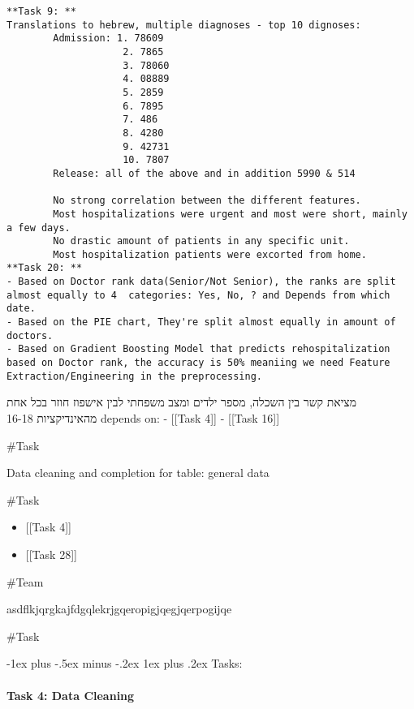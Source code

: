\documentclass[a4paper,landscape]{article}
\makeatletter
\renewcommand{\subsubsection}{\@startsection{subsubsection}{3}{0mm}%
                                {-1ex plus -.5ex minus -.2ex}%
                                {1ex plus .2ex}%
                                {\normalfont\small\bfseries}}
\providecommand{\tightlist}{%
  \setlength{\itemsep}{0pt}\setlength{\parskip}{0pt}}
\makeatother
\begin{document}
\begin{verbatim}
**Task 9: **
Translations to hebrew, multiple diagnoses - top 10 dignoses:
        Admission: 1. 78609
                    2. 7865
                    3. 78060
                    4. 08889
                    5. 2859
                    6. 7895
                    7. 486
                    8. 4280
                    9. 42731
                    10. 7807
        Release: all of the above and in addition 5990 & 514

        No strong correlation between the different features.
        Most hospitalizations were urgent and most were short, mainly a few days.
        No drastic amount of patients in any specific unit.
        Most hospitalization patients were excorted from home.
**Task 20: **
- Based on Doctor rank data(Senior/Not Senior), the ranks are split almost equally to 4  categories: Yes, No, ? and Depends from which date.
- Based on the PIE chart, They're split almost equally in amount of doctors.
- Based on Gradient Boosting Model that predicts rehospitalization based on Doctor rank, the accuracy is 50% meaniing we need Feature Extraction/Engineering in the preprocessing.
\end{verbatim}

מציאת קשר בין השכלה, מספר ילדים ומצב משפחתי לבין אישפוז חוזר בכל אחת
מהאינדיקציות 16-18 depends on: - {[}{[}Task 4{]}{]} - {[}{[}Task
16{]}{]}

\#Task

Data cleaning and completion for table: general data

\#Task

\begin{itemize}
\tightlist
\item
  {[}{[}Task 4{]}{]}
\item
  {[}{[}Task 28{]}{]}
\end{itemize}

\#Team

asdflkjqrgkajfdgqlekrjgqeropigjqegjqerpogijqe

\#Task

\subsubsection{Tasks:}\label{tasks-1}

\paragraph{Task 4: Data Cleaning}\label{task-4-data-cleaning}
\end{document}
